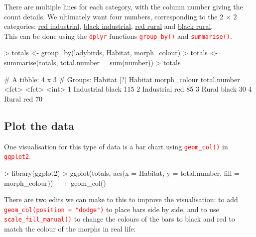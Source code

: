 \documentclass[a4paper,12pt]{article}
\newcommand\code[1]{\textcolor{red}{\texttt{#1}}}
\begin{document}
There are multiple lines for each category, with the column number giving the count details. We ultimately want four numbers, corresponding to the 2 $\times$ 2 categories: \underline{red industrial}, \underline{black industrial}, \underline{red rural} and \underline{black rural}. \\

This can be done using the \code{dplyr} functions \code{group\_by()} and \code{summarise()}.

\begin{shaded}
\begin{Schunk}
\begin{Sinput}
> totals <- group_by(ladybirds, Habitat, morph_colour)
> totals <- summarise(totals, total.number = sum(number))
> totals
\end{Sinput}
\begin{Soutput}
# A tibble: 4 x 3
# Groups:   Habitat [?]
  Habitat    morph_colour total.number
  <fct>      <fct>               <int>
1 Industrial black                 115
2 Industrial red                    85
3 Rural      black                  30
4 Rural      red                    70
\end{Soutput}
\end{Schunk}
\end{shaded}

\subsection{Plot the data}

One visualisation for this type of data is a bar chart using \code{geom\_col()} in \code{ggplot2}.


\begin{shaded}
\begin{Schunk}
\begin{Sinput}
> library(ggplot2)
> ggplot(totals, aes(x = Habitat, y = total.number, fill = morph_colour)) +
+   geom_col() 
\end{Sinput}
\end{Schunk}
\end{shaded}

There are two edits we can make to this to improve the visualisation: to add \code{geom\_col(position = "dodge")} to place bars side by side, and to use \code{scale\_fill\_manual()} to change the colours of the bars to black and red to match the colour of the morphs in real life:
\end{document}
